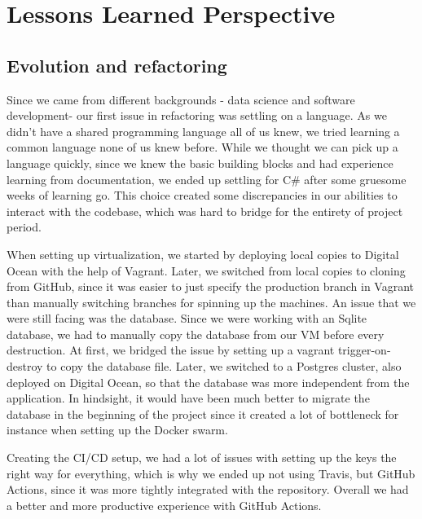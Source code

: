 \documentclass[report/main.tex]{subfiles}
\begin{document}
    \section{Lessons Learned Perspective}
    \label{sec:lessons_learned_persective}
        \subsection{Evolution and refactoring}
        \label{subsec:evolution-and-refactoring}
        
            Since we came from different backgrounds - data science and software development- our first issue in refactoring was settling on a language. As we didn't have a shared programming language all of us knew, we tried learning a common language none of us knew before. While we thought we can pick up a language quickly, since we knew the basic building blocks and had experience learning from documentation, we ended up settling for C\# after some gruesome weeks of learning go. This choice created some discrepancies in our abilities to interact with the codebase, which was hard to bridge for the entirety of project period.
    
            When setting up virtualization, we started by deploying local copies to Digital Ocean with the help of Vagrant. Later, we switched from local copies to cloning from GitHub, since it was easier to just specify the production branch in Vagrant than manually switching branches for spinning up the machines. An issue that we were still facing was the database. Since we were working with an Sqlite database, we had to manually copy the database from our VM before every destruction. At first, we bridged the issue by setting up a vagrant trigger-on-destroy to copy the database file. Later, we switched to a Postgres cluster, also deployed on Digital Ocean, so that the database was more independent from the application. In hindsight, it would have been much better to migrate the database in the beginning of the project since it created a lot of bottleneck for instance when setting up the Docker swarm.
            
            Creating the CI/CD setup, we had a lot of issues with setting up the keys the right way for everything, which is why we ended up not using Travis, but GitHub Actions, since it was more tightly integrated with the repository. Overall we had a better and more productive experience with GitHub Actions. 
    
\end{document}
